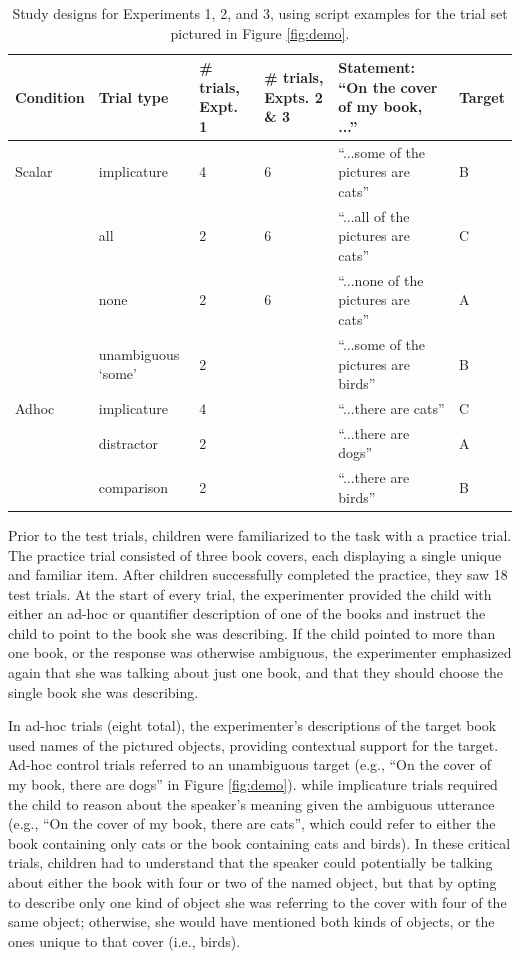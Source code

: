 \documentclass[man]{apa2}
\begin{document}
 \begin{table}
 \footnotesize
 \centering 
     \begin{tabular}{C{1.5cm} C{2cm} C{1.5cm} C{1.5cm} C{4.5cm} C{1.5cm}} 
                      \hline 
       \null   Condition  & Trial type & \# trials, Expt. 1 & \# trials, Expts. 2 \& 3 & Statement: ``On the cover of my book, ...'' & Target   \\ 
       \hline  
            Scalar & implicature & 4 & 6 &  ``...some of the pictures are cats'' & B	 \\ 
          & all  & 2 &  6 & ``...all of the pictures are cats'' & C		                 \\
           & none  & 2 & 6 & ``...none of the pictures are cats'' & A			\\ 
               & unambiguous `some' 	&  2 &  & ``...some of the pictures are birds'' & B					        \\ 
	\hline
	    Adhoc       & implicature & 4 &  & ``...there are cats'' & C 		\\ 
	     & distractor & 2 &  & ``...there are dogs'' & A	     \\ 
          & comparison & 2 &  & ``...there are birds'' & B 	   \\
       \hline 
     \end{tabular} 
     \caption{Study designs for Experiments 1, 2, and 3, using script examples for the trial set pictured in Figure \ref{fig:demo}.  \label{tab:scripts} }
 \end{table}
 
Prior to the test trials, children were familiarized to the task with a practice trial. The practice trial consisted of three book covers, each displaying a single unique and familiar item. After children successfully completed the practice, they saw 18 test trials. At the start of every trial, the experimenter provided the child with either an ad-hoc or quantifier description of one of the books and instruct the child to point to the book she was describing. If the child pointed to more than one book, or the response was otherwise ambiguous, the experimenter emphasized again that she was talking about just one book, and that they should choose the single book she was describing. 

In ad-hoc trials (eight total), the experimenter's descriptions of the target book used names of the pictured objects, providing contextual support for the target. Ad-hoc control trials referred to an unambiguous target (e.g., ``On the cover of my book, there are dogs'' in Figure \ref{fig:demo}). while implicature trials required the child to reason about the speaker's meaning given the ambiguous utterance (e.g., ``On the cover of my book, there are cats'', which could refer to either the book containing only cats or the book containing cats and birds). In these critical trials, children had to understand that the speaker could potentially be talking about either the book with four or two of the named object, but that by opting to describe only one kind of object she was referring to the cover with four of the same object; otherwise, she would have mentioned both kinds of objects, or the ones unique to that cover (i.e., birds). 
\end{document}
